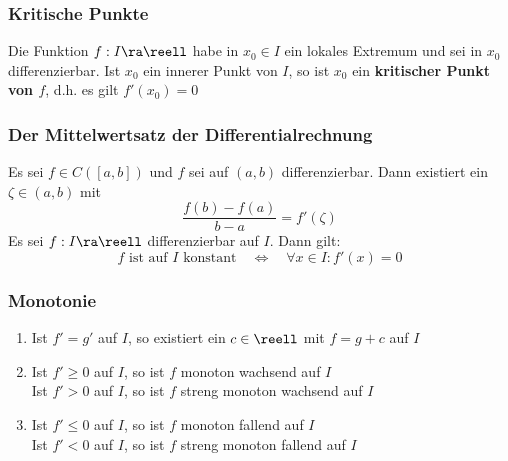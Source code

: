\documentclass{kit}
\begin{document}
    \subsubsection{Kritische Punkte}
      Die Funktion $f:I\ra\reell$ habe in $x_0\in I$ ein lokales Extremum und sei in $x_0$ differenzierbar. Ist $x_0$ ein innerer Punkt von $I$, so ist $x_0$ ein \textbf{kritischer Punkt von $f$}, d.h. es gilt $f'(x_0)=0$
    \subsubsection{Der Mittelwertsatz der Differentialrechnung}
      Es sei $f\in C([a,b])$ und $f$ sei auf $(a,b)$ differenzierbar. Dann existiert ein $\zeta\in(a,b)$ mit
      $$\frac{f(b)-f(a)}{b-a}=f'(\zeta)$$
      Es sei $f:I\ra\reell$ differenzierbar auf $I$. Dann gilt:
      $$f\text{ ist auf }I\text{ konstant}\quad\Longleftrightarrow\quad\forall x\in I:f'(x)=0$$
    \subsubsection{Monotonie}
      \begin{enumerate}
        \item Ist $f'=g'$ auf $I$, so existiert ein $c\in\reell$ mit $f=g+c$ auf $I$
        \item Ist $f'\ge0$ auf $I$, so ist $f$ monoton wachsend auf $I$\\
          Ist $f'>0$ auf $I$, so ist $f$ streng monoton wachsend auf $I$
        \item Ist $f'\le0$ auf $I$, so ist $f$ monoton fallend auf $I$\\
          Ist $f'<0$ auf $I$, so ist $f$ streng monoton fallend auf $I$
      \end{enumerate}
\end{document}
